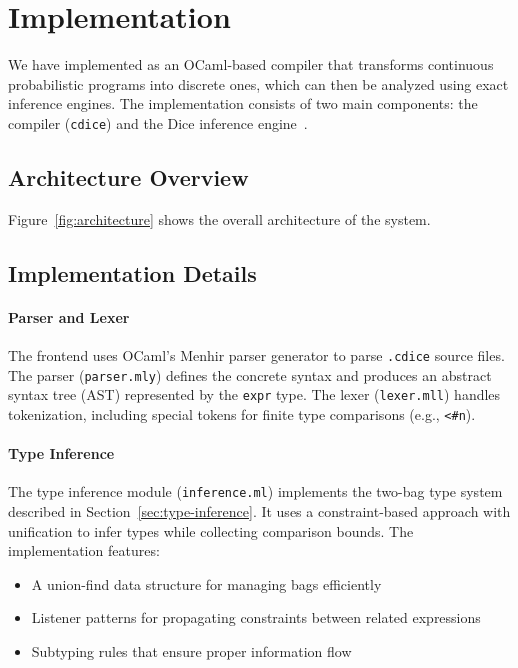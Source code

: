 \section{Implementation}\label{sec:implementation}

We have implemented \Slice{} as an OCaml-based compiler that transforms continuous probabilistic programs into discrete ones, which can then be analyzed using exact inference engines. The implementation consists of two main components: the \Slice{} compiler (\texttt{cdice}) and the Dice inference engine~\cite{Holtzen2020Dice}.

\subsection{Architecture Overview}

Figure~\ref{fig:architecture} shows the overall architecture of the \Slice{} system.



\subsection{Implementation Details}

\paragraph{Parser and Lexer} The frontend uses OCaml's Menhir parser generator to parse \texttt{.cdice} source files. The parser (\texttt{parser.mly}) defines the concrete syntax and produces an abstract syntax tree (AST) represented by the \texttt{expr} type. The lexer (\texttt{lexer.mll}) handles tokenization, including special tokens for finite type comparisons (e.g., \texttt{<\#n}).

\paragraph{Type Inference} The type inference module (\texttt{inference.ml}) implements the two-bag type system described in Section~\ref{sec:type-inference}. It uses a constraint-based approach with unification to infer types while collecting comparison bounds. The implementation features:
\begin{itemize}
    \item A union-find data structure for managing bags efficiently
    \item Listener patterns for propagating constraints between related expressions
    \item Subtyping rules that ensure proper information flow
\end{itemize}

